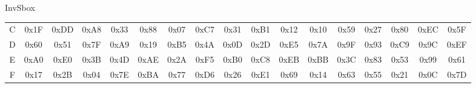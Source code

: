 \begin{frame}[t]{InvSbox}
\begin{table}[]
\begin{tabular}{c|cccccccccccccccc}
			C & 0x1F & 0xDD & 0xA8 & 0x33 & 0x88 & 0x07 & 0xC7 & 0x31 & 0xB1 & 0x12 & 0x10 & 0x59 & 0x27 & 0x80 & 0xEC & 0x5F \\
			D & 0x60 & 0x51 & 0x7F & 0xA9 & 0x19 & 0xB5 & 0x4A & 0x0D & 0x2D & 0xE5 & 0x7A & 0x9F & 0x93 & 0xC9 & 0x9C & 0xEF \\
			E & 0xA0 & 0xE0 & 0x3B & 0x4D & 0xAE & 0x2A & 0xF5 & 0xB0 & 0xC8 & 0xEB & 0xBB & 0x3C & 0x83 & 0x53 & 0x99 & 0x61 \\
			F & 0x17 & 0x2B & 0x04 & 0x7E & 0xBA & 0x77 & 0xD6 & 0x26 & 0xE1 & 0x69 & 0x14 & 0x63 & 0x55 & 0x21 & 0x0C & 0x7D 
		\end{tabular}
	\end{table}
\end{frame}